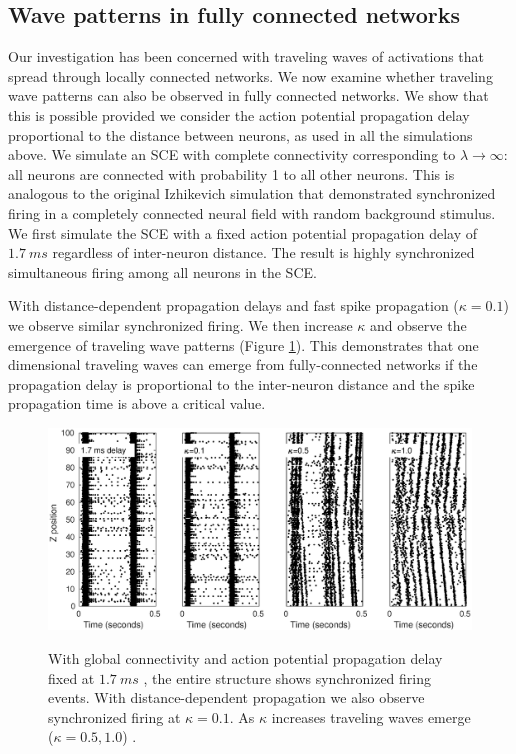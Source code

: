 \documentclass[12pt]{article}
\begin{document}
\FloatBarrier

\subsection{Wave patterns in fully connected networks} \label{sub:delay}
Our investigation has been concerned with traveling waves of activations that spread through locally connected networks.
We now examine whether traveling wave patterns can also be observed in fully connected networks.
We show that this is possible provided we consider the action potential propagation delay proportional to the distance between neurons, as used in all the simulations above.
We simulate an SCE with complete connectivity corresponding to $\lambda \rightarrow \infty$: all neurons are connected with probability 1 to all other neurons.
This is analogous to the original Izhikevich simulation \parencite{izhikevich2003} that demonstrated synchronized firing in a completely connected neural field with random background stimulus.
We first simulate the SCE with a fixed action potential propagation delay of $1.7~ms$ \parencite{Markram1997}  regardless of inter-neuron distance.
The result is highly synchronized simultaneous firing among all neurons in the SCE.
 
With distance-dependent propagation delays and fast spike propagation ($\kappa=0.1$) we observe similar synchronized firing.
We then increase $\kappa$ and observe the emergence of traveling wave patterns (Figure \ref{fig:delay_waves}). 
This demonstrates that one dimensional traveling waves can emerge from fully-connected networks if the propagation delay is proportional to the inter-neuron distance and the spike propagation time is above a critical value.
\begin{figure}[!htb]
 \caption{With global connectivity and action potential propagation delay fixed at $1.7~ms$ , the entire structure shows synchronized firing events.
          With distance-dependent propagation we also observe synchronized firing at $\kappa=0.1$.
          As $\kappa$ increases traveling waves emerge ($\kappa=0.5, 1.0$) .}
 \centering
   \includegraphics[width=\textwidth]{fig/DelayWaves}  
 \label{fig:delay_waves}
\end{figure}
\end{document}
